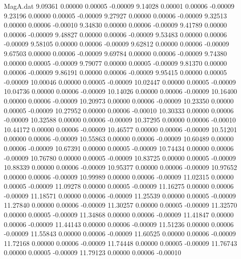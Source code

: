 \begin{filecontents}{MagA.dat}
   9.09361    0.00000    0.00005   -0.00009
   9.14028    0.00001    0.00006   -0.00009
   9.23196    0.00000    0.00005   -0.00009
   9.27927    0.00000    0.00006   -0.00009
   9.32513    0.00000    0.00006   -0.00010
   9.34830    0.00000    0.00006   -0.00009
   9.41789    0.00000    0.00006   -0.00009
   9.48827    0.00000    0.00006   -0.00009
   9.53483    0.00000    0.00006   -0.00009
   9.58105    0.00000    0.00006   -0.00009
   9.62812    0.00000    0.00006   -0.00009
   9.67503    0.00000    0.00006   -0.00009
   9.69784    0.00000    0.00006   -0.00009
   9.74380    0.00000    0.00005   -0.00009
   9.79077    0.00000    0.00005   -0.00009
   9.81370    0.00000    0.00006   -0.00009
   9.86191    0.00000    0.00006   -0.00009
   9.95415    0.00000    0.00005   -0.00009
  10.00046    0.00000    0.00005   -0.00009
  10.02447    0.00000    0.00005   -0.00009
  10.04736    0.00000    0.00006   -0.00009
  10.14026    0.00000    0.00006   -0.00009
  10.16400    0.00000    0.00006   -0.00009
  10.20973    0.00000    0.00006   -0.00009
  10.23350    0.00000    0.00005   -0.00009
  10.27952    0.00000    0.00006   -0.00010
  10.30333    0.00000    0.00006   -0.00009
  10.32588    0.00000    0.00006   -0.00009
  10.37295    0.00000    0.00006   -0.00010
  10.44172    0.00000    0.00006   -0.00009
  10.46577    0.00000    0.00006   -0.00009
  10.51201    0.00000    0.00006   -0.00009
  10.55863    0.00000    0.00006   -0.00009
  10.60489    0.00000    0.00006   -0.00009
  10.67391    0.00000    0.00005   -0.00009
  10.74434    0.00000    0.00006   -0.00009
  10.76780    0.00000    0.00005   -0.00009
  10.83725    0.00000    0.00005   -0.00009
  10.88339    0.00000    0.00006   -0.00009
  10.95377    0.00000    0.00006   -0.00009
  10.97652    0.00000    0.00006   -0.00009
  10.99989    0.00000    0.00006   -0.00009
  11.02315    0.00000    0.00005   -0.00009
  11.09278    0.00000    0.00005   -0.00009
  11.16275    0.00000    0.00006   -0.00009
  11.18571    0.00000    0.00006   -0.00009
  11.25539    0.00000    0.00005   -0.00009
  11.27840    0.00000    0.00006   -0.00009
  11.30257    0.00000    0.00005   -0.00009
  11.32570    0.00000    0.00005   -0.00009
  11.34868    0.00000    0.00006   -0.00009
  11.41847    0.00000    0.00006   -0.00009
  11.44143    0.00000    0.00006   -0.00009
  11.51236    0.00000    0.00006   -0.00009
  11.55843    0.00000    0.00006   -0.00009
  11.60525    0.00000    0.00006   -0.00009
  11.72168    0.00000    0.00006   -0.00009
  11.74448    0.00000    0.00005   -0.00009
  11.76743    0.00000    0.00005   -0.00009
  11.79123    0.00000    0.00006   -0.00010

\end{filecontents}

